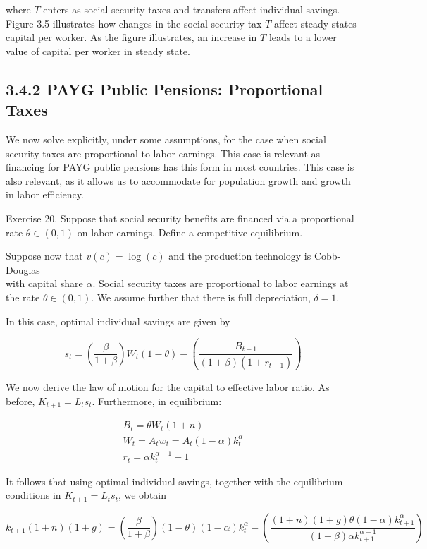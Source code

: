 \documentclass[10pt]{article}
\begin{document}
where $T$ enters as social security taxes and transfers affect individual savings. Figure 3.5 illustrates how changes in the social security tax $T$ affect steady-states capital per worker. As the figure illustrates, an increase in $T$ leads to a lower value of capital per worker in steady state.

\subsection*{3.4.2 PAYG Public Pensions: Proportional Taxes}
We now solve explicitly, under some assumptions, for the case when social security taxes are proportional to labor earnings. This case is relevant as financing for PAYG public pensions has this form in most countries. This case is also relevant, as it allows us to accommodate for population growth and growth in labor efficiency.

Exercise 20. Suppose that social security benefits are financed via a proportional rate $\theta \in(0,1)$ on labor earnings. Define a competitive equilibrium.

Suppose now that $v(c)=\log (c)$ and the production technology is Cobb-Douglas\\
with capital share $\alpha$. Social security taxes are proportional to labor earnings at the rate $\theta \in(0,1)$. We assume further that there is full depreciation, $\delta=1$.

In this case, optimal individual savings are given by

$$
s_{t}=\left(\frac{\beta}{1+\beta}\right) W_{t}(1-\theta)-\left(\frac{B_{t+1}}{(1+\beta)\left(1+r_{t+1}\right)}\right)
$$

We now derive the law of motion for the capital to effective labor ratio. As before, $K_{t+1}=L_{t} s_{t}$. Furthermore, in equilibrium:

$$
\begin{gathered}
B_{t}=\theta W_{t}(1+n) \\
W_{t}=A_{t} w_{t}=A_{t}(1-\alpha) k_{t}^{\alpha} \\
r_{t}=\alpha k_{t}^{\alpha-1}-1
\end{gathered}
$$

It follows that using optimal individual savings, together with the equilibrium conditions in $K_{t+1}=L_{t} s_{t}$, we obtain

$$
k_{t+1}(1+n)(1+g)=\left(\frac{\beta}{1+\beta}\right)(1-\theta)(1-\alpha) k_{t}^{\alpha}-\left(\frac{(1+n)(1+g) \theta(1-\alpha) k_{t+1}^{\alpha}}{(1+\beta) \alpha k_{t+1}^{\alpha-1}}\right)
$$
\end{document}
